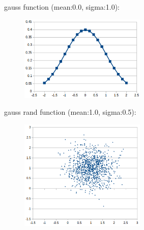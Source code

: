 \documentclass[12pt, a4paper]{article}
\begin{document}
gauss function (mean:0.0, sigma:1.0):\\
\begin{center}
\begin{figure}[H]
\centering\includegraphics[width=6cm]{./gauss.png}\\
\end{figure}
\end{center}

gauss rand function (mean:1.0, sigma:0.5):\\
\begin{center}
\begin{figure}[H]
\centering\includegraphics[width=6cm]{./gaussrnd.png}\\
\end{figure}
\end{center}
\end{document}
